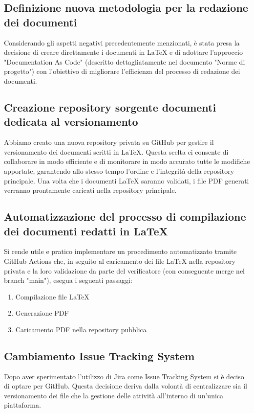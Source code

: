 \documentclass{article}
\begin{document}
    \subsection{Definizione nuova metodologia per la redazione dei documenti}
    Considerando gli aspetti negativi precedentemente menzionati, è stata presa la decisione di creare direttamente i documenti in LaTeX e di adottare l'approccio "Documentation As Code" (descritto dettagliatamente nel documento "Norme di progetto") con l'obiettivo di migliorare l'efficienza del processo di redazione dei documenti.
    \subsection{Creazione repository sorgente documenti dedicata al versionamento}
    Abbiamo creato una nuova repository privata su GitHub per gestire il versionamento dei documenti scritti in LaTeX. Questa scelta ci consente di collaborare in modo efficiente e di monitorare in modo accurato tutte le modifiche apportate, garantendo allo stesso tempo l'ordine e l'integrità della repository principale. Una volta che i documenti LaTeX saranno validati, i file PDF generati verranno prontamente caricati nella repository principale.

    \subsection{Automatizzazione del processo di compilazione dei documenti redatti in LaTeX}
    Si rende utile e pratico implementare un procedimento automatizzato tramite GitHub Actions che, in seguito al caricamento dei file LaTeX nella repository privata e la loro validazione da parte del verificatore (con conseguente merge nel branch "main"), esegua i seguenti passaggi:
    \begin{enumerate}
        \item Compilazione file LaTeX
        \item Generazione PDF
        \item Caricamento PDF nella repository pubblica        
    \end{enumerate}

    \subsection{Cambiamento Issue Tracking System}
    Dopo aver sperimentato l’utilizzo di Jira come Issue Tracking System si è deciso di optare per GitHub. Questa decisione deriva dalla volontà di centralizzare sia il versionamento dei file che la gestione delle attività all'interno di un'unica piattaforma.
\end{document}
